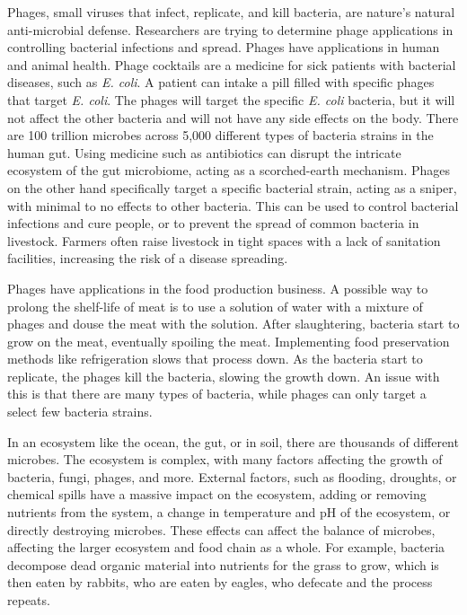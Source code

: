 Phages, small viruses that infect, replicate, and kill bacteria, are nature's natural anti-microbial defense. Researchers are trying to determine phage applications in controlling bacterial infections and spread. Phages have applications in human and animal health. Phage cocktails are a medicine for sick patients with bacterial diseases, such as \textit{E. coli}. A patient can intake a pill filled with specific phages that target \textit{E. coli}. The phages will target the specific \textit{E. coli} bacteria, but it will not affect the other bacteria and will not have any side effects on the body. There are 100 trillion microbes across 5,000 different types of bacteria strains in the human gut. Using medicine such as antibiotics can disrupt the intricate ecosystem of the gut microbiome, acting as a scorched-earth mechanism. Phages on the other hand specifically target a specific bacterial strain, acting as a sniper, with minimal to no effects to other bacteria. This can be used to control bacterial infections and cure people, or to prevent the spread of common bacteria in livestock. Farmers often raise livestock in tight spaces with a lack of sanitation facilities, increasing the risk of a disease spreading. 


Phages have applications in the food production business. A possible way to prolong the shelf-life of meat is to use a solution of water with a mixture of phages and douse the meat with the solution. After slaughtering, bacteria start to grow on the meat, eventually spoiling the meat. Implementing food preservation methods like refrigeration slows that process down. As the bacteria start to replicate, the phages kill the bacteria, slowing the growth down. An issue with this is that there are many types of bacteria, while phages can only target a select few bacteria strains. 

In an ecosystem like the ocean, the gut, or in soil, there are thousands of different microbes. The ecosystem is complex, with many factors affecting the growth of bacteria, fungi,  phages, and more. External factors, such as flooding, droughts, or chemical spills have a massive impact on the ecosystem, adding or removing nutrients from the system, a change in temperature and pH of the ecosystem, or directly destroying microbes. These effects can affect the balance of microbes, affecting the larger ecosystem and food chain as a whole. For example, bacteria decompose dead organic material into nutrients for the grass to grow, which is then eaten by rabbits, who are eaten by eagles, who defecate and the process repeats. 

